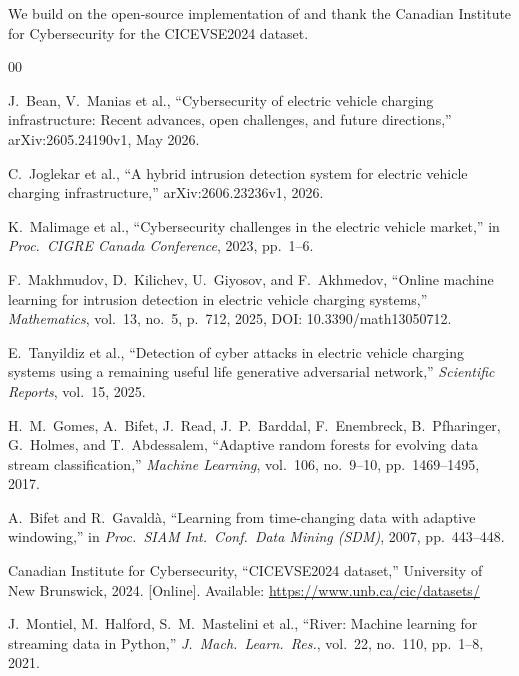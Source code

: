 \documentclass[conference]{IEEEtran}
\begin{document}
We build on the open-source implementation of \cite{b4} and thank the Canadian Institute for Cybersecurity for the CICEVSE2024 dataset. 
\begin{thebibliography}{00}

 J.\ Bean, V.\ Manias et al., ``Cybersecurity of electric vehicle charging infrastructure: Recent advances, open challenges, and future directions,'' arXiv:2605.24190v1, May 2026.

 C.\ Joglekar et al., ``A hybrid intrusion detection system for electric vehicle charging infrastructure,'' arXiv:2606.23236v1, 2026.

 K.\ Malimage et al., ``Cybersecurity challenges in the electric vehicle market,'' in \emph{Proc.\ CIGRE Canada Conference}, 2023, pp.\ 1--6.

 F.\ Makhmudov, D.\ Kilichev, U.\ Giyosov, and F.\ Akhmedov, ``Online machine learning for intrusion detection in electric vehicle charging systems,'' \emph{Mathematics}, vol.\ 13, no.\ 5, p.\ 712, 2025, DOI: 10.3390/math13050712.

 E.\ Tanyildiz et al., ``Detection of cyber attacks in electric vehicle charging systems using a remaining useful life generative adversarial network,'' \emph{Scientific Reports}, vol.\ 15, 2025.

 H.\ M.\ Gomes, A.\ Bifet, J.\ Read, J.\ P.\ Barddal, F.\ Enembreck, B.\ Pfharinger, G.\ Holmes, and T.\ Abdessalem, ``Adaptive random forests for evolving data stream classification,'' \emph{Machine Learning}, vol.\ 106, no.\ 9--10, pp.\ 1469--1495, 2017.

 A.\ Bifet and R.\ Gavald\`{a}, ``Learning from time-changing data with adaptive windowing,'' in \emph{Proc.\ SIAM Int.\ Conf.\ Data Mining (SDM)}, 2007, pp.\ 443--448.

 Canadian Institute for Cybersecurity, ``CICEVSE2024 dataset,'' University of New Brunswick, 2024. [Online]. Available: \url{https://www.unb.ca/cic/datasets/}

 J.\ Montiel, M.\ Halford, S.\ M.\ Mastelini et al., ``River: Machine learning for streaming data in Python,'' \emph{J.\ Mach.\ Learn.\ Res.}, vol.\ 22, no.\ 110, pp.\ 1--8, 2021.

\end{thebibliography}
\end{document}
